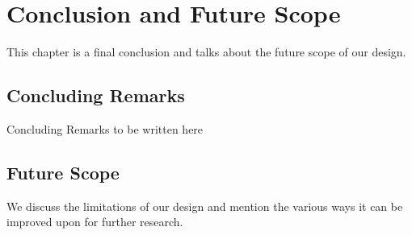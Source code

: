 \chapter{Conclusion and Future Scope}
This chapter is a final conclusion and talks about the future scope of our design.
\section{Concluding Remarks}
Concluding Remarks to be written here

\section{Future Scope}
We discuss the limitations of our design and mention the various ways it can be improved upon for further research.

